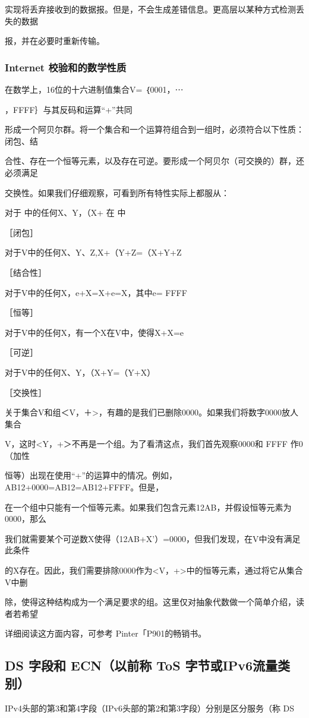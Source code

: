 实现将丢弃接收到的数据报。但是，不会生成差错信息。更高层以某种方式检测丢失的数据

报，并在必要时重新传输。

\subsubsection{Internet 校验和的数学性质}
在数学上，16位的十六进制值集合V= ｛0001，⋯

，FFFF｝与其反码和运算“+”共同

形成一个阿贝尔群。将一个集合和一个运算符组合到一组时，必须符合以下性质：闭包、结

合性、存在一个恒等元素，以及存在可逆。要形成一个阿贝尔（可交换的）群，还必须满足

交换性。如果我们仔细观察，可看到所有特性实际上都服从：

对于 中的任何X、Y，（X+ 在 中

［闭包］

 对于V中的任何X、Y、Z,X+（Y+Z=（X+Y+Z

［结合性］

 对于V中的任何X，e+X=X+e=X，其中e= FFFF

［恒等］

 对于V中的任何X，有一个X在V中，使得X+X=e

［可逆］

 对于V中的任何X、Y，（X+Y=（Y+X）

［交换性］

关于集合V和组＜V，＋>，有趣的是我们已删除0000。如果我们将数字0000放人集合

V，这时<Y，+＞不再是一个组。为了看清这点，我们首先观察0000和 FFFF 作0（加性

恒等）出现在使用“+”的运算中的情况。例如，AB12+0000=AB12=AB12+FFFF。但是，

在一个组中只能有一个恒等元素。如果我们包含元素12AB，并假设恒等元素为0000，那么

我们就需要某个可逆数X使得（12AB+X'）=0000，但我们发现，在V中没有满足此条件

的X存在。因此，我们需要排除0000作为<V，+>中的恒等元素，通过将它从集合V中删

除，使得这种结构成为一个满足要求的组。这里仅对抽象代数做一个简单介绍，读者若希望

详细阅读这方面内容，可参考 Pinter「P901的畅销书。

\subsection{DS 字段和 ECN（以前称 ToS 字节或IPv6流量类别）}
IPv4头部的第3和第4字段（IPv6头部的第2和第3字段）分别是区分服务（称 DS

